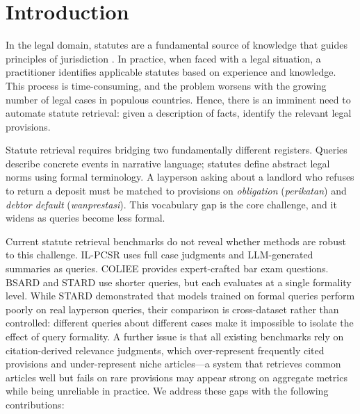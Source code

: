 \section{Introduction}
\label{sec:intro}

In the legal domain, statutes are a fundamental source of knowledge that guides principles of jurisdiction \citep{ilpcsr}. In practice, when faced with a legal situation, a practitioner identifies applicable statutes based on experience and knowledge. This process is time-consuming, and the problem worsens with the growing number of legal cases in populous countries. Hence, there is an imminent need to automate statute retrieval: given a description of facts, identify the relevant legal provisions.

Statute retrieval requires bridging two fundamentally different registers. Queries describe concrete events in narrative language; statutes define abstract legal norms using formal terminology. A layperson asking about a landlord who refuses to return a deposit must be matched to provisions on \textit{obligation} (\textit{perikatan}) and \textit{debtor default} (\textit{wanprestasi}). This vocabulary gap is the core challenge, and it widens as queries become less formal.

Current statute retrieval benchmarks do not reveal whether methods are robust to this challenge. IL-PCSR \citep{ilpcsr} uses full case judgments and LLM-generated summaries as queries. COLIEE \citep{coliee2024} provides expert-crafted bar exam questions. BSARD \citep{bsard} and STARD \citep{stard} use shorter queries, but each evaluates at a single formality level. While STARD demonstrated that models trained on formal queries perform poorly on real layperson queries, their comparison is cross-dataset rather than controlled: different queries about different cases make it impossible to isolate the effect of query formality. A further issue is that all existing benchmarks rely on citation-derived relevance judgments, which over-represent frequently cited provisions and under-represent niche articles---a system that retrieves common articles well but fails on rare provisions may appear strong on aggregate metrics while being unreliable in practice. We address these gaps with the following contributions:

